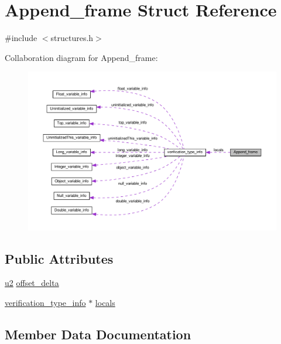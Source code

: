 \hypertarget{structAppend__frame}{}\section{Append\+\_\+frame Struct Reference}
\label{structAppend__frame}


{\ttfamily \#include $<$structures.\+h$>$}



Collaboration diagram for Append\+\_\+frame\+:
\nopagebreak
\begin{figure}[H]
\begin{center}
\leavevmode
\includegraphics[width=350pt]{structAppend__frame__coll__graph}
\end{center}
\end{figure}
\subsection*{Public Attributes}
\begin{DoxyCompactItemize}
\item 
\hyperlink{structures_8h_a55ef8d87fd202b8417704c089899c5b9}{u2} \hyperlink{structAppend__frame_a8a6963561a77d764146805d9d99bd61a}{offset\+\_\+delta}
\item 
\hyperlink{structverification__type__info}{verification\+\_\+type\+\_\+info} $\ast$ \hyperlink{structAppend__frame_ad05887fedeaec3902dd866e10aa7d192}{locals}
\end{DoxyCompactItemize}


\subsection{Member Data Documentation}
